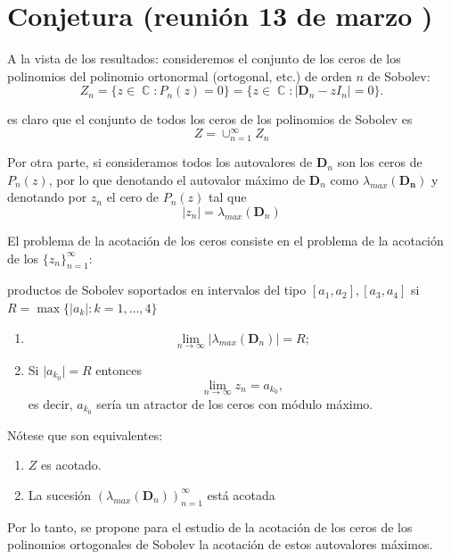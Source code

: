 \documentclass[11pt]{article}
\DeclareMathOperator{\CC}{\mathbb C}%
\begin{document}
\section{Conjetura (reunión 13 de marzo )}

\noindent A la vista de los resultados: consideremos el conjunto de los ceros de los polinomios del polinomio ortonormal (ortogonal, etc.) de orden $n$ de Sobolev:
$$
  Z_n=\{ z\in \CC: P_n(z)=0\}= \{ z \in \CC: \vert \mathbf{D}_n - zI_n\vert=0\}.
$$

\noindent es claro que el conjunto de todos los ceros de los polinomios de Sobolev es
$$
  Z=\cup_{n=1}^{\infty} Z_n
$$

\noindent Por otra parte, si consideramos todos los autovalores de $\mathbf{D}_n$ son los ceros de $P_n(z)$, por lo que denotando el autovalor m\'{a}ximo de $\mathbf{D}_n$ como $\lambda_{max}(\mathbf{D_n})$ y denotando por $z_n$ el cero de $P_n(z)$ tal que
$$
  \vert z_n\vert =\lambda_{max}(\mathbf{D}_n)
$$

\noindent El problema de la acotación de los ceros consiste en el problema de la acotación de los $\{z_n\}_{n=1}^{\infty}$:



\bigskip

 productos de Sobolev soportados en intervalos del tipo
$[a_1,a_2],[a_3,a_4]$ si $R=\max \{\vert a_k \vert : k=1,\dots,4\}$

\begin{enumerate}
  \item
        $$
          \lim_{n\to \infty} \vert \lambda_{max}(\mathbf{D}_n)\vert = R;
        $$
  \item Si $\vert a_{k_0} \vert=R$ entonces
        $$
          \lim_{n\to \infty} z_n = a_{k_0},
        $$
        \noindent es decir, $a_{k_0}$ sería un atractor de los ceros con módulo máximo.

\end{enumerate}

\noindent Nótese que son equivalentes:
\begin{enumerate}
  \item $Z$ es acotado.
  \item La sucesión $(\lambda_{max}(\mathbf{D}_n))_{n=1}^{\infty}$ está acotada
\end{enumerate}

\noindent Por lo tanto, se propone para el estudio de la acotación de los ceros de los polinomios ortogonales de Sobolev la acotación de estos autovalores máximos.
\end{document}
